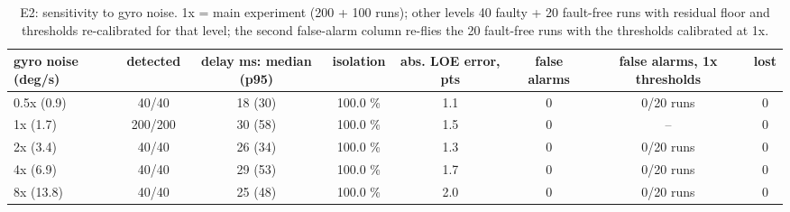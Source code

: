 \begin{table}[t]
\centering
\caption{E2: sensitivity to gyro noise. 1x = main experiment (200 + 100 runs); other levels 40 faulty + 20 fault-free runs with residual floor and thresholds re-calibrated for that level; the second false-alarm column re-flies the 20 fault-free runs with the thresholds calibrated at 1x.}
\label{tab:e2noise}
\footnotesize
\setlength{\tabcolsep}{3pt}
\begin{adjustbox}{max width=\linewidth}
\begin{tabular}{lccccccc}
\toprule
gyro noise (deg/s) & detected & delay ms: median (p95) & isolation & abs. LOE error, pts & false alarms & false alarms, 1x thresholds & lost \\
\midrule
0.5x (0.9) & 40/40 & 18 (30) & 100.0 \% & 1.1 & 0 & 0/20 runs & 0 \\
1x (1.7) & 200/200 & 30 (58) & 100.0 \% & 1.5 & 0 & -- & 0 \\
2x (3.4) & 40/40 & 26 (34) & 100.0 \% & 1.3 & 0 & 0/20 runs & 0 \\
4x (6.9) & 40/40 & 29 (53) & 100.0 \% & 1.7 & 0 & 0/20 runs & 0 \\
8x (13.8) & 40/40 & 25 (48) & 100.0 \% & 2.0 & 0 & 0/20 runs & 0 \\
\bottomrule
\end{tabular}
\end{adjustbox}
\end{table}
